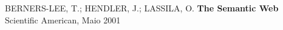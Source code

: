 \begin{thebibliography}{99}

 


    BERNERS-LEE, T.; HENDLER, J.; LASSILA, O.
    \textbf{The Semantic Web}
    Scientific American, Maio 2001

\end{thebibliography}
